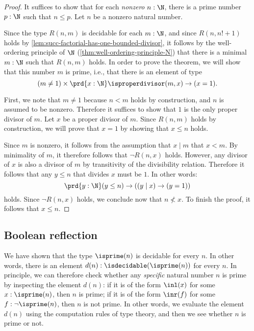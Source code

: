 \begin{proof}
  It suffices to show that for each \emph{nonzero} $n:\N$, there is a prime number $p:\N$ such that $n\leq p$. Let $n$ be a nonzero natural number.

  Since the type $R(n,m)$ is decidable for each $m:\N$, and since $R(n,{n!}+1)$ holds by \cref{lem:succ-factorial-has-one-bounded-divisor}, it follows by the well-ordering principle of $\N$ (\cref{thm:well-ordering-principle-N}) that there is a minimal $m:\N$ such that $R(n,m)$ holds. In order to prove the theorem, we will show that this number $m$ is prime, i.e., that there is an element of type
  \begin{equation*}
    (m\neq 1)\times \prd{x:\N} \isproperdivisor(m,x)\to (x=1).
  \end{equation*}

  First, we note that $m\neq 1$ because $n<m$ holds by construction, and $n$ is assumed to be nonzero. Therefore it suffices to show that $1$ is the only proper divisor of $m$. Let $x$ be a proper divisor of $m$. Since $R(n,m)$ holds by construction, we will prove that $x=1$ by showing that $x\leq n$ holds.

  Since $m$ is nonzero, it follows from the assumption that $x\mid m$ that $x<m$. By minimality of $m$, it therefore follows that $\neg R(n,x)$ holds. However, any divisor of $x$ is also a divisor of $m$ by transitivity of the divisibility relation. Therefore it follows that any $y\leq n$ that divides $x$ must be $1$. In other words:
  \begin{equation*}
    \prd{y:\N}(y\leq n)\to ((y\mid x)\to (y=1))
  \end{equation*}
  holds. Since $\neg R(n,x)$ holds, we conclude now that $n\nless x$. To finish the proof, it follows that $x\leq n$.
\end{proof}

\subsection{Boolean reflection}\label{sec:boolean-reflection}

We have shown that the type $\isprime(n)$ is decidable for every $n$. In other words, there is an element $d(n):\isdecidable(\isprime(n))$ for every $n$. In principle, we can therefore check whether any \emph{specific} natural number $n$ is prime by inspecting the element $d(n)$: if it is of the form $\inl(x)$ for some $x:\isprime(n)$, then $n$ is prime; if it is of the form $\inr(f)$ for some $f:\neg\isprime(n)$, then $n$ is not prime. In other words, we evaluate the element $d(n)$ using the computation rules of type theory, and then we see whether $n$ is prime or not.

